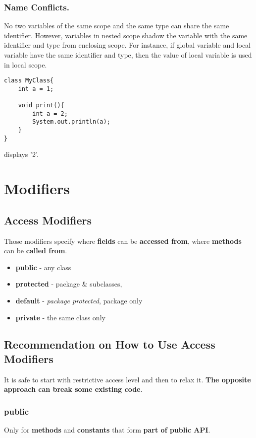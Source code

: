 \documentclass{report}
\begin{document}
\subsection{Name Conflicts.}
No two variables of the same scope and the same type can share the same identifier. However, variables in nested scope shadow the variable with the same identifier and type from enclosing scope. For instance, if global variable and local variable have the same identifier and type, then the value of local variable is used in local scope.
\begin{verbatim}
class MyClass{
    int a = 1;
    
    void print(){
        int a = 2;
        System.out.println(a);
    }
}
\end{verbatim}
displays '2'.



\chapter{Modifiers}


\section{Access Modifiers}
Those modifiers specify where \textbf{fields} can be \textbf{accessed from}, where \textbf{methods} can be \textbf{called from}.
\begin{itemize}
	\item \textbf{public} - any class
	\item \textbf{protected} - package \& subclasses, 
	\item \textbf{default} - \textit{package protected}, package only
	\item \textbf{private} - the same class only
\end{itemize}


\section{Recommendation on How to  Use Access Modifiers}
It is safe to start with restrictive access level and then to relax it. \textbf{The opposite
approach can break some existing code}.

\subsection{public}
Only for \textbf{methods} and \textbf{constants} that form \textbf{part of public API}.
\end{document}
